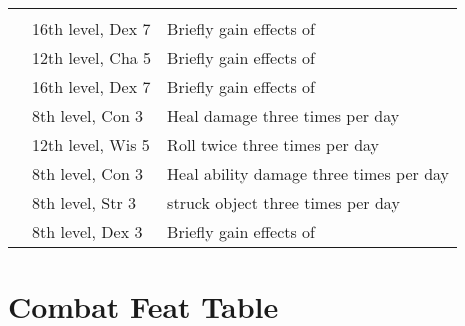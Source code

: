 {\begin{longtabu}{>{\lcol}p{15em} >{\lcol}p{15em} >{\lcol}X}
\midrule
{} &  &  \\
 & 16th level, Dex 7 & Briefly gain effects of  \\
 & 12th level, Cha 5 & Briefly gain effects of  \\
 & 16th level, Dex 7 & Briefly gain effects of  \\
 & 8th level, Con 3 & Heal damage three times per day \\
 & 12th level, Wis 5 & Roll twice three times per day \\
 & 8th level, Con 3 & Heal ability damage three times per day \\
 & 8th level, Str 3 &  struck object three times per day \\
 & 8th level, Dex 3 & Briefly gain effects of  \\
\end{longtabu}}

\section{Combat Feat Table}

